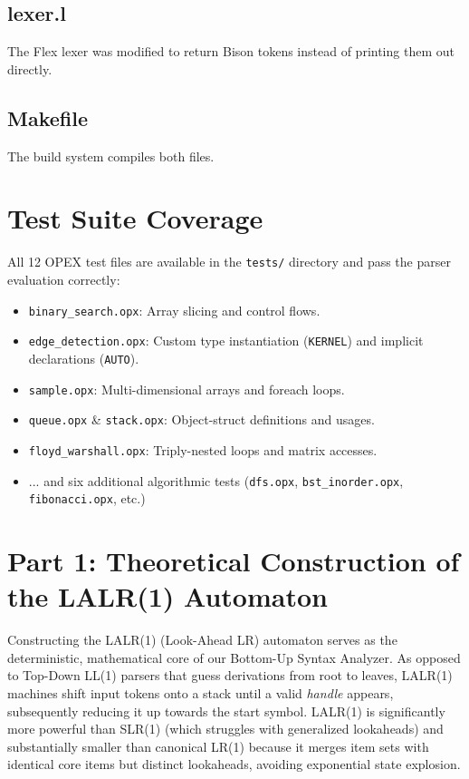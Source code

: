 \documentclass[12pt, a4paper]{article}
\begin{document}
\subsection{lexer.l}
The Flex lexer was modified to return Bison tokens instead of printing them out directly.


\subsection{Makefile}
The build system compiles both files.


\section{Test Suite Coverage}
All 12 OPEX test files are available in the \texttt{tests/} directory and pass the parser evaluation correctly:
\begin{itemize}
    \item \texttt{binary\_search.opx}: Array slicing and control flows.
    \item \texttt{edge\_detection.opx}: Custom type instantiation (\texttt{KERNEL}) and implicit declarations (\texttt{AUTO}).
    \item \texttt{sample.opx}: Multi-dimensional arrays and foreach loops.
    \item \texttt{queue.opx} \& \texttt{stack.opx}: Object-struct definitions and usages.
    \item \texttt{floyd\_warshall.opx}: Triply-nested loops and matrix accesses.
    \item ... and six additional algorithmic tests (\texttt{dfs.opx}, \texttt{bst\_inorder.opx}, \texttt{fibonacci.opx}, etc.)
\end{itemize}

\section{Part 1: Theoretical Construction of the LALR(1) Automaton}
Constructing the LALR(1) (Look-Ahead LR) automaton serves as the deterministic, mathematical core of our Bottom-Up Syntax Analyzer. As opposed to Top-Down LL(1) parsers that guess derivations from root to leaves, LALR(1) machines shift input tokens onto a stack until a valid \textit{handle} appears, subsequently reducing it up towards the start symbol. LALR(1) is significantly more powerful than SLR(1) (which struggles with generalized lookaheads) and substantially smaller than canonical LR(1) because it merges item sets with identical core items but distinct lookaheads, avoiding exponential state explosion.
\end{document}
